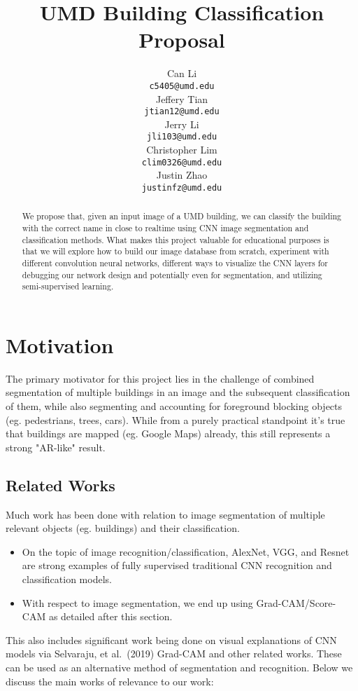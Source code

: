 \documentclass{article}
\title{ UMD Building Classification Proposal }
\author{%
  Can Li \\
  \texttt{c5405@umd.edu} \\
  \And 
  Jeffery Tian \\
  \texttt{jtian12@umd.edu} \\
  \And 
  Jerry Li\\
  \texttt{jli103@umd.edu} \\
  \And 
  Christopher Lim \\
  \texttt{clim0326@umd.edu} \\
  \And 
  Justin Zhao \\
  \texttt{justinfz@umd.edu} \\
}
\begin{document}
\maketitle


\begin{abstract}
  We propose that, given an input image of a UMD building, we can classify the building with the correct name in close to realtime using CNN image segmentation and classification methods. What makes this project valuable for educational purposes is that we will explore how to build our image database from scratch, experiment with different convolution neural networks, different ways to visualize the CNN layers for debugging our network design and potentially even for segmentation, and utilizing semi-supervised learning.
\end{abstract}


\section{Motivation}
\label{motivation}


The primary motivator for this project lies in the challenge of combined segmentation of multiple buildings in an image and the subsequent classification of them, while also segmenting and accounting for foreground blocking objects (eg. pedestrians, trees, cars). While from a purely practical standpoint it's true that buildings are mapped (eg. Google Maps) already, this still represents a strong "AR-like" result.


\subsection{Related Works}

Much work has been done with relation to image segmentation of multiple relevant objects (eg. buildings) and their classification.

\begin{itemize}
    \item On the topic of image recognition/classification, AlexNet, VGG, and Resnet are strong examples of fully supervised traditional CNN recognition and classification models. 
    \item With respect to image segmentation, we end up using Grad-CAM/Score-CAM as detailed after this section.
\end{itemize}

This also includes significant work being done on visual explanations of CNN models via Selvaraju, et al.\ (2019) Grad-CAM and other related works. These can be used as an alternative method of segmentation and recognition. Below we discuss the main works of relevance to our work:
\end{document}
